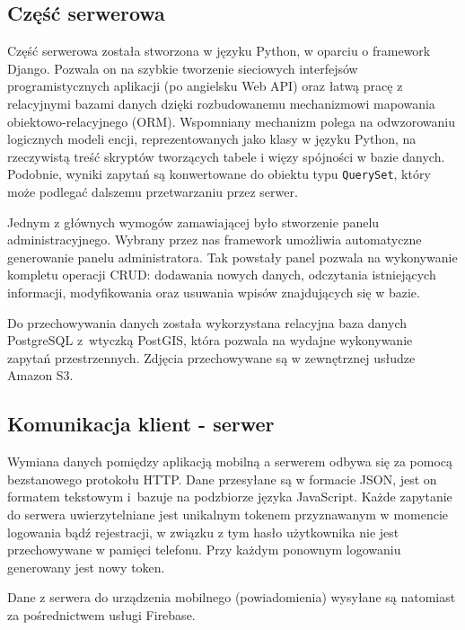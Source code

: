 \documentclass[licencjacka]{pracamgr}
\begin{document}
\subsection{Część serwerowa}

Część serwerowa została stworzona w języku Python, w oparciu o framework Django. Pozwala on na szybkie tworzenie sieciowych interfejsów programistycznych aplikacji (po angielsku Web API) oraz łatwą pracę z relacyjnymi bazami danych dzięki rozbudowanemu mechanizmowi mapowania obiektowo-relacyjnego (ORM). Wspomniany mechanizm polega na odwzorowaniu logicznych modeli encji, reprezentowanych jako klasy w języku Python, na rzeczywistą treść skryptów tworzących tabele i więzy spójności w bazie danych. Podobnie, wyniki zapytań są konwertowane do obiektu typu \texttt{QuerySet}, który może podlegać dalszemu przetwarzaniu przez serwer.

Jednym z głównych wymogów zamawiającej było stworzenie panelu administracyjnego. Wybrany przez nas framework umożliwia automatyczne generowanie panelu administratora. Tak powstały panel pozwala na wykonywanie kompletu operacji CRUD: dodawania nowych danych, odczytania istniejących informacji, modyfikowania oraz usuwania wpisów znajdujących się w bazie.

Do przechowywania danych została wykorzystana relacyjna baza danych PostgreSQL z~wtyczką PostGIS, która pozwala na wydajne wykonywanie zapytań przestrzennych. Zdjęcia przechowywane są w zewnętrznej usłudze Amazon S3.

\subsection{Komunikacja klient - serwer}
Wymiana danych pomiędzy aplikacją mobilną a serwerem odbywa się za pomocą bezstanowego protokołu HTTP. Dane przesyłane są w formacie JSON, jest on formatem tekstowym i~bazuje na podzbiorze języka JavaScript. Każde zapytanie do serwera uwierzytelniane jest unikalnym tokenem przyznawanym w momencie logowania bądź rejestracji, w związku z tym hasło użytkownika nie jest przechowywane w pamięci telefonu. Przy każdym ponownym logowaniu generowany jest nowy token.

Dane z serwera do urządzenia mobilnego (powiadomienia) wysyłane są natomiast za pośrednictwem usługi Firebase.
\end{document}
